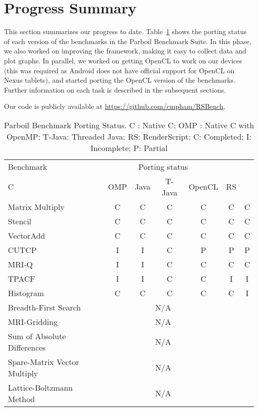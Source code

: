 \section*{Progress Summary}

This section summarizes our progress to date. Table~\ref{table:parboil} shows the
porting status of each version of the benchmarks in the Parboil Benchmark Suite.
In this phase, we also worked on improving the framework, making it easy to collect
data and plot graphs. In parallel, we worked on getting OpenCL to work on our
devices (this was required as Android does not have official support for OpenCL
on Nexus tablets), and started porting the OpenCL version of the benchmarks. 
Further information on each task is described in the subsequent sections.

Our code is publicly available at \url{https://github.com/cmpham/RSBench}.

\begin{table}[h]\small
\centering
\begin{tabular}{ | l | c | c | c | c | c | c |}
    \hline 
    Benchmark & \multicolumn{4}{|c|}{Porting status} \\ \cline{2-5}
             C & OMP & Java & T-Java & OpenCL & RS \\ \hline
    Matrix Multiply & C & C & C & C & C & C \\ \hline
    Stencil & C & C & C & C & C & C \\ \hline
    VectorAdd & C & C & C & C & C & C \\ \hline
    CUTCP & I & I & C & P  & P  & P \\ \hline
    MRI-Q & I & I & C & C & C & C \\ \hline
    TPACF & I & I & C & C & I & I \\ \hline
    Histogram & C & C & C & C & C & I \\ \hline
    Breadth-First Search & \multicolumn{4}{|c|}{N/A} \\ \hline
    MRI-Gridding & \multicolumn{4}{|c|}{N/A} \\ \hline
    Sum of Absolute Differences & \multicolumn{4}{|c|}{N/A} \\ \hline
    Spare-Matrix Vector Multiply & \multicolumn{4}{|c|}{N/A} \\ \hline
    Lattice-Boltzmann Method & \multicolumn{4}{|c|}{N/A} \\ \hline
    \hline
\end{tabular}
\caption{Parboil Benchmark Porting Status. C : Native C; OMP : Native C with OpenMP; T-Java: Threaded Java; RS:
RenderScript; C: Completed; I: Incomplete; P: Partial}
\label{table:parboil}
\end{table}

